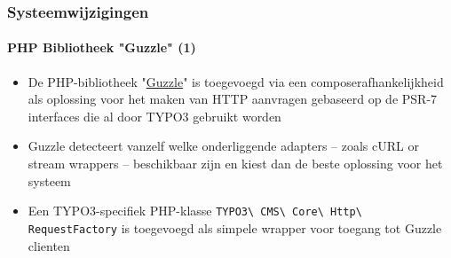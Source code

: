 \begin{frame}[fragile]
	\frametitle{Systeemwijzigingen}
	\framesubtitle{PHP Bibliotheek "Guzzle" (1)}

	\begin{itemize}

		\item De PHP-bibliotheek
			"\href{http://docs.guzzlephp.org}{Guzzle}"
			is toegevoegd via een composerafhankelijkheid als oplossing voor het
			maken van HTTP aanvragen gebaseerd op de PSR-7 interfaces die al
			door TYPO3 gebruikt worden

		\item Guzzle detecteert vanzelf welke onderliggende adapters -- zoals
		 	cURL or stream wrappers -- beschikbaar zijn en kiest dan de beste
		 	oplossing voor het systeem

		\item Een TYPO3-specifiek PHP-klasse
			\texttt{TYPO3\textbackslash
				CMS\textbackslash
				Core\textbackslash
				Http\textbackslash
				RequestFactory}\newline
			is toegevoegd als simpele wrapper voor toegang tot Guzzle clienten

	\end{itemize}

\end{frame}


